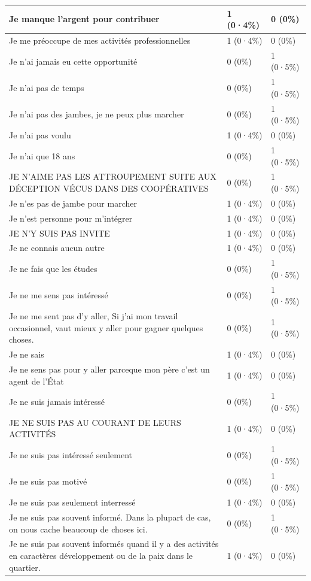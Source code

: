 \documentclass[
]{book}
\begin{document}
\begin{tabular}{l|l|l}
\hline
Je manque l'argent pour contribuer & 1 (0·4\%) & 0 (0\%)\\
\hline
Je me préoccupe de mes activités professionnelles & 1 (0·4\%) & 0 (0\%)\\
\hline
Je n'ai jamais eu cette opportunité & 0 (0\%) & 1 (0·5\%)\\
\hline
Je n'ai pas de temps & 0 (0\%) & 1 (0·5\%)\\
\hline
Je n'ai pas des jambes, je ne peux plus marcher & 0 (0\%) & 1 (0·5\%)\\
\hline
Je n'ai pas voulu & 1 (0·4\%) & 0 (0\%)\\
\hline
Je n'ai que 18 ans & 0 (0\%) & 1 (0·5\%)\\
\hline
JE N'AIME PAS LES ATTROUPEMENT SUITE AUX DÉCEPTION VÉCUS DANS DES COOPÉRATIVES & 0 (0\%) & 1 (0·5\%)\\
\hline
Je n'es pas de jambe pour marcher & 1 (0·4\%) & 0 (0\%)\\
\hline
Je n'est personne pour m'intégrer & 1 (0·4\%) & 0 (0\%)\\
\hline
JE N'Y SUIS PAS INVITE & 1 (0·4\%) & 0 (0\%)\\
\hline
Je ne connais aucun autre & 1 (0·4\%) & 0 (0\%)\\
\hline
Je ne fais que les études & 0 (0\%) & 1 (0·5\%)\\
\hline
Je ne me sens pas intéressé & 0 (0\%) & 1 (0·5\%)\\
\hline
Je ne me sent pas d'y aller,
Si j'ai mon travail occasionnel, vaut mieux y aller pour gagner quelques choses. & 0 (0\%) & 1 (0·5\%)\\
\hline
Je ne sais & 1 (0·4\%) & 0 (0\%)\\
\hline
Je ne sens pas pour y aller parceque mon père c'est un agent de l'État & 1 (0·4\%) & 0 (0\%)\\
\hline
Je ne suis jamais intéressé & 0 (0\%) & 1 (0·5\%)\\
\hline
JE NE SUIS PAS AU COURANT DE LEURS ACTIVITÉS & 1 (0·4\%) & 0 (0\%)\\
\hline
Je ne suis pas intéressé seulement & 0 (0\%) & 1 (0·5\%)\\
\hline
Je ne suis pas motivé & 0 (0\%) & 1 (0·5\%)\\
\hline
Je ne suis pas seulement interressé & 1 (0·4\%) & 0 (0\%)\\
\hline
Je ne suis pas souvent informé. Dans la plupart de cas, on nous cache beaucoup de choses ici. & 0 (0\%) & 1 (0·5\%)\\
\hline
Je ne suis pas souvent informés quand il y a des activités en caractères développement ou de la paix dans le quartier. & 1 (0·4\%) & 0 (0\%)\\

\end{tabular}
\end{document}
